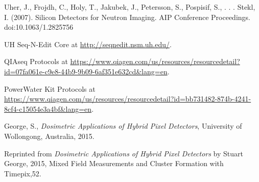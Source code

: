 \begin{thebibliography}{9}
  Uher, J., Frojdh, C., Holy, T., Jakubek, J., Petersson, S., Pospisif, S., . . . Stekl, I. (2007). Silicon Detectors for Neutron Imaging. AIP Conference Proceedings. doi:10.1063/1.2825756
  
  UH Seq-N-Edit Core at \url{http://seqnedit.nsm.uh.edu/}.
  
  QIAseq Protocols at \url{https://www.qiagen.com/us/resources/resourcedetail?id=07fa061e-c9e8-44b9-9b09-6af351e632cd&lang=en}.  

  PowerWater Kit Protocols at \url{https://www.qiagen.com/us/resources/resourcedetail?id=bb731482-874b-4241-8cf4-c15054e3a4bf&lang=en}.  
  
  George, S., \textit{Dosimetric Applications of Hybrid Pixel Detectors}, University of Wollongong, Australia, 2015.

  Reprinted from \textit{Dosimetric Applications of Hybrid Pixel Detectors} by Stuart George, 2015, Mixed Field Measurements and Cluster Formation with Timepix,52.


  


	




\end{thebibliography}
